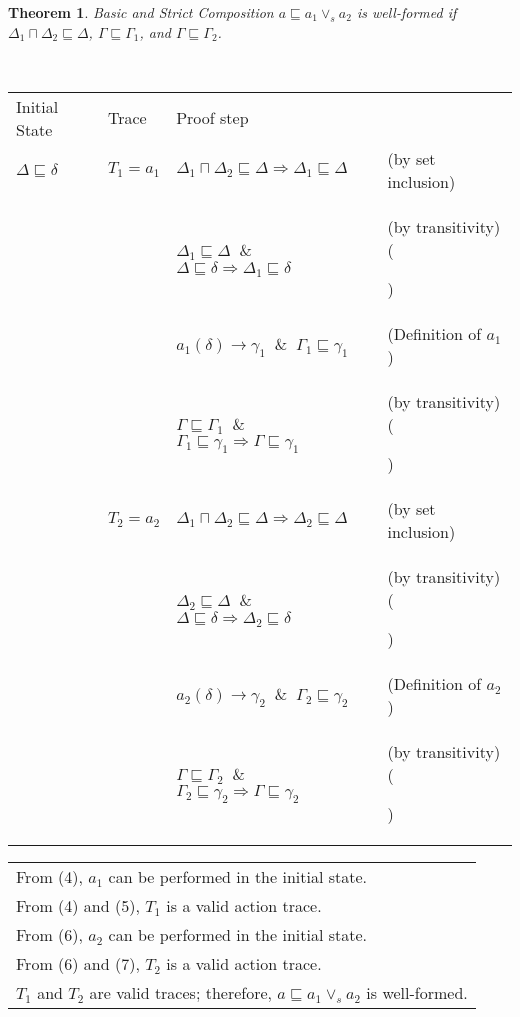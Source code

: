 \documentclass[12pt,journal,letterpaper,onecolumn]{IEEEtran}
\newcounter{myCounter}
\renewcommand{\themyCounter}{\arabic{myCounter}\addtocounter{myCounter}{1}}
\newtheorem{theorem}{Theorem}[section]
\begin{document}
\begin{theorem}
Basic and Strict Composition $a\sqsubseteq a_1 \vee_s a_2$ is
well-formed if $\Delta_1 \sqcap \Delta_2 \sqsubseteq \Delta$,
$\Gamma \sqsubseteq \Gamma_1$, and $\Gamma \sqsubseteq \Gamma_2$.
\label{theorem:basicstrictchoice}
\end{theorem}
\\
\begin{minipage}{6in} \begin{center}
\begin{tabular}{llp{8cm}p{3.8cm}}
Initial State & Trace &  Proof step & \\
$\Delta \sqsubseteq \delta$ & $T_1 = a_1$ & $\Delta_1 \sqcap \Delta_2 \sqsubseteq \Delta \Rightarrow \Delta_1 \sqsubseteq \Delta$& (by set inclusion)\\
& & $\Delta_1 \sqsubseteq \Delta $ $~\&~$ $ \Delta \sqsubseteq \delta \Rightarrow \Delta_1 \sqsubseteq \delta$ & (by transitivity) \hfill(\themyCounter) \\
& & $a_1(\delta)\rightarrow \gamma_1 $ $~\&~$ $ \Gamma_1 \sqsubseteq \gamma_1$&  (Definition of $a_1$)  \\
& & $\Gamma \sqsubseteq \Gamma_1 $ $~\&~$ $ \Gamma_1 \sqsubseteq \gamma_1 \Rightarrow \Gamma \sqsubseteq \gamma_1$& (by transitivity) \hfill(\themyCounter)\\
& $T_2 = a_2$ & $\Delta_1 \sqcap \Delta_2 \sqsubseteq \Delta \Rightarrow \Delta_2 \sqsubseteq \Delta$& (by set inclusion)\\
& & $\Delta_2 \sqsubseteq \Delta $ $~\&~$ $ \Delta \sqsubseteq \delta \Rightarrow \Delta_2 \sqsubseteq \delta$ & (by transitivity) \hfill(\themyCounter) \\
& & $a_2(\delta)\rightarrow \gamma_2 $ $~\&~$ $ \Gamma_2 \sqsubseteq \gamma_2$& (Definition of $a_2$) \\
& & $\Gamma \sqsubseteq \Gamma_2 $ $~\&~$ $ \Gamma_2 \sqsubseteq \gamma_2 \Rightarrow \Gamma \sqsubseteq \gamma_2$& (by transitivity) \hfill(\themyCounter)\\
\end{tabular}
\end{center}
\end{minipage}

\begin{minipage}{6in} \begin{center}
\begin{tabular}{llp{7.5cm}p{3.8cm}}
\multicolumn{4}{l}{From (4), $a_1$ can be performed in the initial state.}\\
\multicolumn{4}{l}{From (4) and (5), $T_1$ is a valid action trace.}\\
\multicolumn{4}{l}{From (6), $a_2$ can be performed in the initial state.}\\
\multicolumn{4}{l}{From (6) and (7), $T_2$ is a valid action trace.}\\
\multicolumn{4}{l}{$T_1$ and $T_2$ are valid traces; therefore,
$a\sqsubseteq a_1 \vee_s a_2$ is well-formed.}\\
\end{tabular}
\end{center}
\end{minipage}
\end{document}
